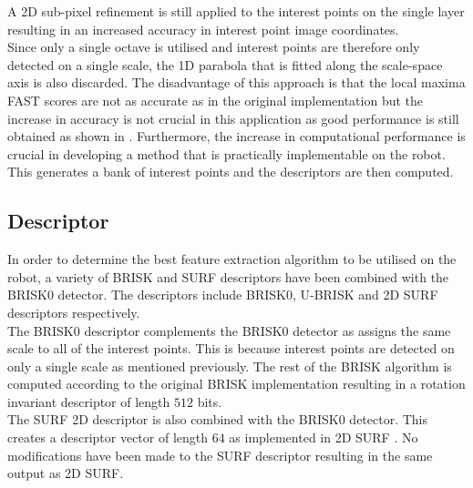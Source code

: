 \documentclass[11pt]{report}
\begin{document}

A 2D sub-pixel refinement is still applied to the interest points on the single layer resulting in an increased accuracy in interest point image coordinates.\\

Since only a single octave is utilised and interest points are therefore only detected on a single scale, the 1D parabola that is fitted along the scale-space axis \cite{Leutenegger2011} is also discarded. The disadvantage of this approach is that the local maxima FAST scores are not as accurate as in the original implementation but the increase in accuracy is not crucial in this application as good performance is still obtained as shown in . Furthermore, the increase in computational performance is crucial in developing a method that is practically implementable on the robot. This generates a bank of interest points and the descriptors are then computed.\\

\subsection{Descriptor}
\label{sec:BRISK0Describe}
In order to determine the best feature extraction algorithm to be utilised on the robot, a variety of BRISK and SURF descriptors have been combined with the BRISK0 detector. The descriptors include BRISK0, U-BRISK and 2D SURF descriptors respectively.\\

The BRISK0 descriptor complements the BRISK0 detector as assigns the same scale to all of the interest points. This is because interest points are detected on only a single scale as mentioned previously. The rest of the BRISK algorithm is computed according to the original BRISK implementation resulting in a rotation invariant descriptor of length $512$ bits\cite{Leutenegger2011}.\\

The SURF 2D descriptor is also combined with the BRISK0 detector. This creates a descriptor vector of length $64$ as implemented in 2D SURF \cite{Bay}. No modifications have been made to the SURF descriptor resulting in the same output as 2D SURF.\\ 
\end{document}
